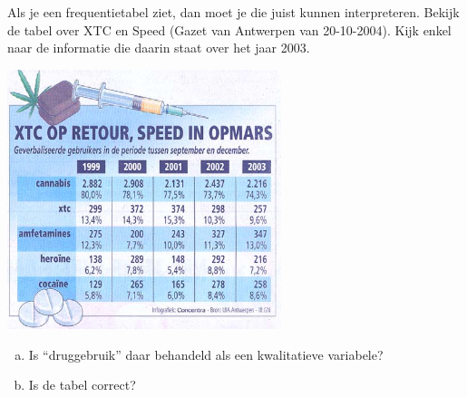 \documentclass[12pt,twoside,a4paper]{article}
\begin{document}
\begin{oefening}
Als je een frequentietabel ziet, dan moet je die juist kunnen interpreteren. Bekijk de tabel over XTC en Speed (Gazet van Antwerpen van 20-10-2004). Kijk enkel naar de informatie die daarin staat over het jaar 2003.

\begin{center}
\includegraphics[width=0.6\textwidth]{tabel-drugs}
\end{center}

\begin{enumerate}[(a)]
  \item Is “druggebruik” daar behandeld als een kwalitatieve variabele?
  \item Is de tabel correct?
\end{enumerate}
\end{oefening}
\end{document}
